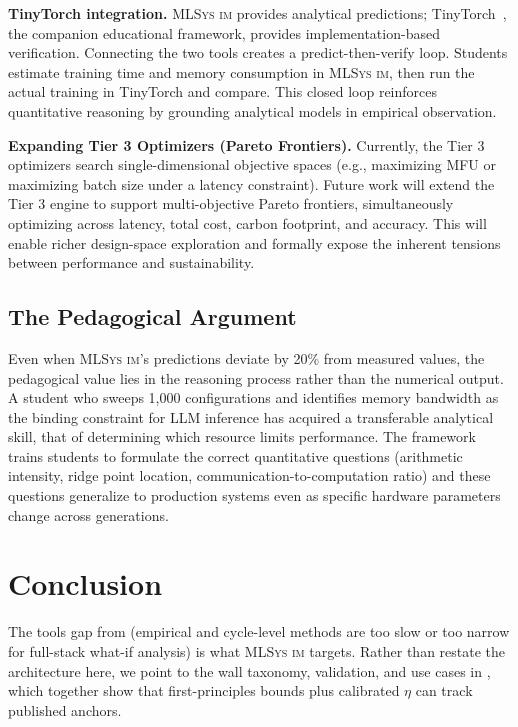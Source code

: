 \documentclass[10pt,twocolumn]{article}
\newcommand{\mlsysim}{\mbox{\textsc{MLSys}\,\textperiodcentered\,\textsc{im}}\xspace}
\begin{document}
\textbf{TinyTorch integration.} \mlsysim provides analytical predictions; TinyTorch~\citep{tinytorch2025}, the companion educational framework, provides implementation-based verification. Connecting the two tools creates a predict-then-verify loop. Students estimate training time and memory consumption in \mlsysim, then run the actual training in TinyTorch and compare. This closed loop reinforces quantitative reasoning by grounding analytical models in empirical observation.

\textbf{Expanding Tier 3 Optimizers (Pareto Frontiers).} Currently, the Tier 3 optimizers search single-dimensional objective spaces (e.g., maximizing MFU or maximizing batch size under a latency constraint). Future work will extend the Tier 3 engine to support multi-objective Pareto frontiers, simultaneously optimizing across latency, total cost, carbon footprint, and accuracy. This will enable richer design-space exploration and formally expose the inherent tensions between performance and sustainability.

\subsection{The Pedagogical Argument}

Even when \mlsysim's predictions deviate by 20\% from measured values, the pedagogical value lies in the reasoning process rather than the numerical output. A student who sweeps 1{,}000 configurations and identifies memory bandwidth as the binding constraint for LLM inference has acquired a transferable analytical skill, that of determining which resource limits performance. The framework trains students to formulate the correct quantitative questions (arithmetic intensity, ridge point location, communication-to-computation ratio) and these questions generalize to production systems even as specific hardware parameters change across generations.

\section{Conclusion}
\label{sec:conclusion}

The tools gap from  (empirical and cycle-level methods are too slow or too narrow for full-stack what-if analysis) is what \mlsysim targets. Rather than restate the architecture here, we point to the wall taxonomy, validation, and use cases in , which together show that first-principles bounds plus calibrated $\eta$ can track published anchors.
\end{document}
